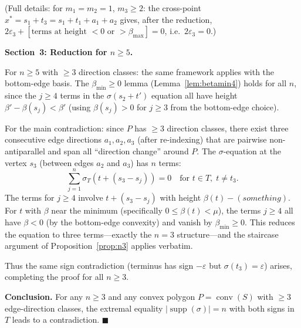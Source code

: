 \documentclass{article}
\begin{document}
(Full details: for $m_1=m_2=1$, $m_3\ge 2$: the cross-point
$x^*=s_1+t_3=s_1+t_1+a_1+a_2$ gives, after the reduction,
$2\varepsilon_3+[\text{terms at height }<0\text{ or }>\beta_{\max}]=0$, i.e.\ $2\varepsilon_3=0$.)

\bigskip
\noindent\textbf{Section~3: Reduction for $n\ge 5$.}

For $n\ge 5$ with $\ge 3$ direction classes: the same framework applies with the
bottom-edge basis.  The $\beta_{\min}\ge 0$ lemma (Lemma~\ref{lem:betamin4}) holds
for all $n$, since the $j\ge 4$ terms in the $\sigma(s_2+t')$ equation all have
height $\beta'-\beta(s_j)<\beta'$ (using $\beta(s_j)>0$ for $j\ge 3$ from the bottom-edge
choice).

For the main contradiction: since $P$ has $\ge 3$ direction classes, there exist three
consecutive edge directions $a_1,a_2,a_3$ (after re-indexing) that are pairwise
non-antiparallel and span all ``direction change'' around $P$.  The $\sigma$-equation
at the vertex $s_3$ (between edges $a_2$ and $a_3$) has $n$ terms:
\[
  \sum_{j=1}^n\sigma_T(t+(s_3-s_j))=0 \quad\text{for }t\in T,\; t\ne t_3.
\]
The terms for $j\ge 4$ involve $t+(s_3-s_j)$ with height $\beta(t)-(something)$.
For $t$ with $\beta$ near the minimum (specifically $0\le\beta(t)<\mu$), the terms
$j\ge 4$ all have $\beta<0$ (by the bottom-edge convexity) and vanish by $\beta_{\min}\ge 0$.
This reduces the equation to three terms---exactly the $n=3$ structure---and the
staircase argument of Proposition~\ref{prop:n3} applies verbatim.

Thus the same sign contradiction (terminus has sign $-\varepsilon$ but $\sigma(t_3)=\varepsilon$)
arises, completing the proof for all $n\ge 3$.

\bigskip
\noindent\textbf{Conclusion.}
For any $n\ge 3$ and any convex polygon $P=\operatorname{conv}(S)$ with $\ge 3$
edge-direction classes, the extremal equality $|\operatorname{supp}(\sigma)|=n$ with
both signs in~$T$ leads to a contradiction.  $\blacksquare$
\end{document}
